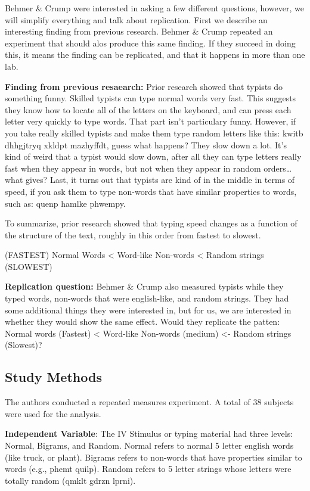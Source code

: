 \documentclass[]{book}
\theoremstyle{definition}
\theoremstyle{definition}
\theoremstyle{definition}
\theoremstyle{remark}
\begin{document}
Behmer \& Crump were interested in asking a few different questions,
however, we will simplify everything and talk about replication. First
we describe an interesting finding from previous research. Behmer \&
Crump repeated an experiment that should alos produce this same finding.
If they succeed in doing this, it means the finding can be replicated,
and that it happens in more than one lab.

\textbf{Finding from previous resaearch:} Prior research showed that
typists do something funny. Skilled typists can type normal words very
fast. This suggests they know how to locate all of the letters on the
keyboard, and can press each letter very quickly to type words. That
part isn't particulary funny. However, if you take really skilled
typists and make them type random letters like this: kwitb dhhgjtryq
xkldpt mazhyffdt, guess what happens? They slow down a lot. It's kind of
weird that a typist would slow down, after all they can type letters
really fast when they appear in words, but not when they appear in
random orders\ldots{}what gives? Last, it turns out that typists are
kind of in the middle in terms of speed, if you ask them to type
non-words that have similar properties to words, such as: quenp hamlke
phwempy.

To summarize, prior research showed that typing speed changes as a
function of the structure of the text, roughly in this order from
fastest to slowest.

(FASTEST) Normal Words \textless{} Word-like Non-words \textless{}
Random strings (SLOWEST)

\textbf{Replication question:} Behmer \& Crump also measured typists
while they typed words, non-words that were english-like, and random
strings. They had some additional things they were interested in, but
for us, we are interested in whether they would show the same effect.
Would they replicate the patten: Normal words (Fastest) \textless{}
Word-like Non-words (medium) \textless{}- Random strings (Slowest)?

\subsection{Study Methods}\label{study-methods-1}

The authors conducted a repeated measures experiment. A total of 38
subjects were used for the analysis.

\textbf{Independent Variable}: The IV Stimulus or typing material had
three levels: Normal, Bigrams, and Random. Normal refers to normal 5
letter english words (like truck, or plant). Bigrams refers to non-words
that have properties similar to words (e.g., phemt quilp). Random refers
to 5 letter strings whose letters were totally random (qmklt gdrzn
lprni).
\end{document}
